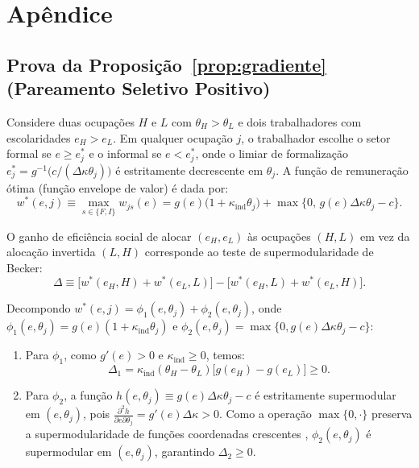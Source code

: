 \section{Apêndice}

\setcounter{table}{0}
\renewcommand{\thetable}{A\arabic{table}}

\subsection{Prova da Proposição~\ref{prop:gradiente} (Pareamento Seletivo Positivo)}

Considere duas ocupações $H$ e $L$ com $\theta_H > \theta_L$ e dois trabalhadores com escolaridades $e_H > e_L$. Em qualquer ocupação $j$, o trabalhador escolhe o setor formal se $e \ge e_j^*$ e o informal se $e < e_j^*$, onde o limiar de formalização $e_j^* = g^{-1}\big(c / (\Delta\kappa \theta_j)\big)$ é estritamente decrescente em $\theta_j$. A função de remuneração ótima (função envelope de valor) é dada por:
\begin{equation}
    w^*(e, j) \equiv \max_{s \in \{F, I\}} w_{js}(e) = g(e)\big(1 + \kappa_{\text{ind}}\theta_j\big) + \max\big\{0, \, g(e)\Delta\kappa\theta_j - c\big\}.
    \label{eq:envelope}
\end{equation}

O ganho de eficiência social de alocar $(e_H, e_L)$ às ocupações $(H, L)$ em vez da alocação invertida $(L, H)$ corresponde ao teste de supermodularidade de Becker:
\begin{equation}
    \Delta \equiv \big[w^*(e_H, H) + w^*(e_L, L)\big] - \big[w^*(e_H, L) + w^*(e_L, H)\big].
\end{equation}

Decompondo $w^*(e, j) = \phi_1(e, \theta_j) + \phi_2(e, \theta_j)$, onde $\phi_1(e, \theta_j) = g(e)(1 + \kappa_{\text{ind}}\theta_j)$ e $\phi_2(e, \theta_j) = \max\{0, g(e)\Delta\kappa\theta_j - c\}$:
\begin{enumerate}
    \item Para $\phi_1$, como $g'(e) > 0$ e $\kappa_{\text{ind}} \ge 0$, temos:
    \begin{equation}
        \Delta_1 = \kappa_{\text{ind}}(\theta_H - \theta_L)\big[g(e_H) - g(e_L)\big] \ge 0.
    \end{equation}
    \item Para $\phi_2$, a função $h(e, \theta_j) \equiv g(e)\Delta\kappa\theta_j - c$ é estritamente supermodular em $(e, \theta_j)$, pois $\frac{\partial^2 h}{\partial e \partial \theta_j} = g'(e)\Delta\kappa > 0$. Como a operação $\max\{0, \cdot\}$ preserva a supermodularidade de funções coordenadas crescentes \citep[Teorema 2.6.1]{topkis1998supermodularity}, $\phi_2(e, \theta_j)$ é supermodular em $(e, \theta_j)$, garantindo $\Delta_2 \ge 0$.
\end{enumerate}

